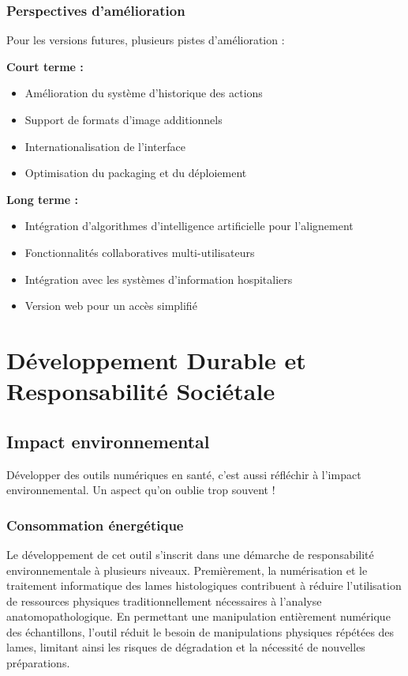 \documentclass[11pt,a4paper]{report}
\begin{document}
\subsection{Perspectives d'amélioration}

Pour les versions futures, plusieurs pistes d'amélioration :

\textbf{Court terme :}
\begin{itemize}
\item Amélioration du système d'historique des actions
\item Support de formats d'image additionnels
\item Internationalisation de l'interface
\item Optimisation du packaging et du déploiement
\end{itemize}

\textbf{Long terme :}
\begin{itemize}
\item Intégration d'algorithmes d'intelligence artificielle pour l'alignement
\item Fonctionnalités collaboratives multi-utilisateurs
\item Intégration avec les systèmes d'information hospitaliers
\item Version web pour un accès simplifié
\end{itemize}

\chapter{Développement Durable et Responsabilité Sociétale}

\section{Impact environnemental}

Développer des outils numériques en santé, c'est aussi réfléchir à l'impact environnemental. Un aspect qu'on oublie trop souvent !

\subsection{Consommation énergétique}

Le développement de cet outil s'inscrit dans une démarche de responsabilité environnementale à plusieurs niveaux. Premièrement, la numérisation et le traitement informatique des lames histologiques contribuent à réduire l'utilisation de ressources physiques traditionnellement nécessaires à l'analyse anatomopathologique. En permettant une manipulation entièrement numérique des échantillons, l'outil réduit le besoin de manipulations physiques répétées des lames, limitant ainsi les risques de dégradation et la nécessité de nouvelles préparations.
\end{document}
